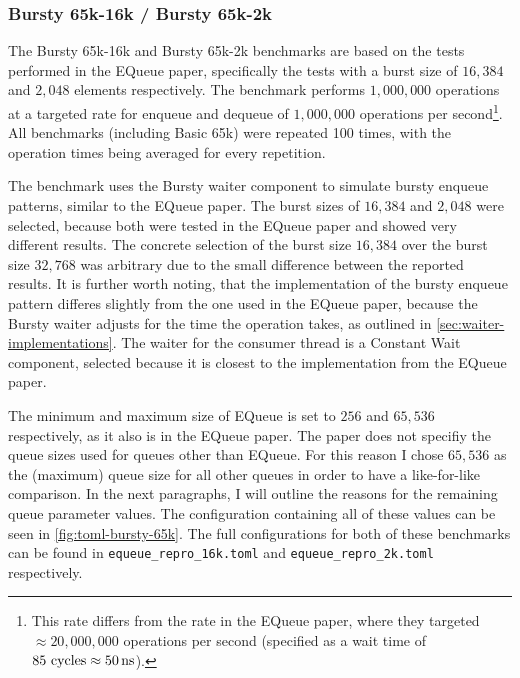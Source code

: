 \subsubsection{Bursty 65k-16k / Bursty 65k-2k}
\label{sec:bench-bursty-65k-16k}

The Bursty 65k-16k and Bursty 65k-2k benchmarks are based on the tests performed in the EQueue paper,
specifically the tests with a burst size of $16,384$ and $2,048$ elements respectively.
The benchmark performs $1,000,000$ operations at a targeted rate for enqueue and dequeue of $1,000,000$
operations per second\footnote{This rate differs from the rate in the EQueue paper, where they targeted
    $\approx 20,000,000$ operations per second (specified as a wait time of $85\text{ cycles}\approx \SI{50}{\nano\second}$).
}.
All benchmarks (including Basic 65k) were repeated 100 times, with the operation times being averaged for
every repetition.

The benchmark uses the Bursty waiter component to simulate bursty enqueue patterns, similar to the EQueue paper.
The burst sizes of $16,384$ and $2,048$ were selected, because both were tested in the EQueue paper and showed
very different results.
The concrete selection of the burst size $16,384$ over the burst size $32,768$ was arbitrary due to the small
difference between the reported results.
It is further worth noting, that the implementation of the bursty enqueue pattern differes slightly from the
one used in the EQueue paper, because the Bursty waiter adjusts for the time the operation takes, as outlined
in \autoref{sec:waiter-implementations}.
The waiter for the consumer thread is a Constant Wait component, selected because it is closest to the
implementation from the EQueue paper.

The minimum and maximum size of EQueue is set to $256$ and $65,536$ respectively, as it also is in the EQueue paper.
The paper does not specifiy the queue sizes used for queues other than EQueue.
For this reason I chose $65,536$ as the (maximum) queue size for all other queues in order to have a
like-for-like comparison.
In the next paragraphs, I will outline the reasons for the remaining queue parameter values.
The configuration containing all of these values can be seen in \autoref{fig:toml-bursty-65k}.
The full configurations for both of these benchmarks can be found in \texttt{equeue\_repro\_16k.toml} and
\texttt{equeue\_repro\_2k.toml} respectively.

